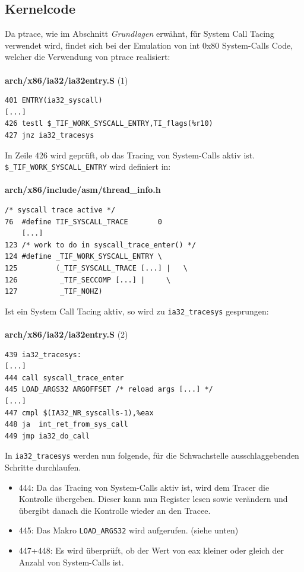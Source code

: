 \documentclass[11pt,a4paper]{article}
\begin{document}
{\subsection{Kernelcode}
Da ptrace, wie im Abschnitt \emph{Grundlagen} erwähnt, für System Call Tacing verwendet wird, findet sich bei der Emulation von int 0x80 System-Calls Code, welcher die Verwendung von ptrace realisiert:\\
\\
\textbf{arch/x86/ia32/ia32entry.S} (1)
\begin{lstlisting}[frame=single]
401 ENTRY(ia32_syscall)
[...]
426 testl $_TIF_WORK_SYSCALL_ENTRY,TI_flags(%r10)
427 jnz ia32_tracesys
\end{lstlisting}
In Zeile 426 wird geprüft, ob das Tracing von System-Calls aktiv ist.\\
\texttt{\$\_TIF\_WORK\_SYSCALL\_ENTRY} wird definiert in:\\
\\
\textbf{arch/x86/include/asm/thread\_info.h}
\begin{lstlisting}[frame=single]
    /* syscall trace active */
76  #define TIF_SYSCALL_TRACE       0
    [...]
123 /* work to do in syscall_trace_enter() */
124 #define _TIF_WORK_SYSCALL_ENTRY \
125         (_TIF_SYSCALL_TRACE [...] |   \
126          _TIF_SECCOMP [...] |     \
127          _TIF_NOHZ)
\end{lstlisting}
Ist ein System Call Tacing aktiv, so wird zu \texttt{ia32\_tracesys} gesprungen:\\
\\
\textbf{arch/x86/ia32/ia32entry.S} (2)
\begin{lstlisting}[frame=single]
439 ia32_tracesys:
[...]
444 call syscall_trace_enter
445 LOAD_ARGS32 ARGOFFSET /* reload args [...] */
[...]
447 cmpl $(IA32_NR_syscalls-1),%eax
448 ja  int_ret_from_sys_call
449 jmp ia32_do_call
\end{lstlisting}
In \texttt{ia32\_tracesys} werden nun folgende, für die Schwachstelle ausschlaggebenden Schritte durchlaufen.
\begin{itemize}
\item 444: Da das Tracing von System-Calls aktiv ist, wird dem Tracer die Kontrolle übergeben. Dieser kann nun Register lesen sowie verändern und übergibt danach die Kontrolle wieder an den Tracee.
\item 445: Das Makro \texttt{LOAD\_ARGS32} wird aufgerufen. (siehe unten)
\item 447+448: Es wird überprüft, ob der Wert von eax kleiner oder gleich der Anzahl von System-Calls ist.

\end{itemize}}
\end{document}
